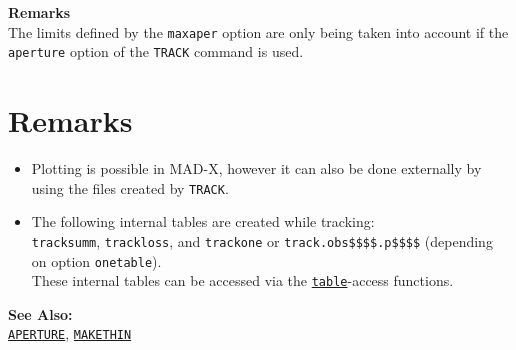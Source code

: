 {\bf Remarks}\\ 
The limits defined by the \texttt{maxaper} option are only being taken
into account if the \texttt{aperture} option of the \texttt{TRACK}
command is used. 
     

\section{Remarks}
\begin{itemize}
   \item Plotting is possible in MAD-X, however it can also be done
     externally by using the files created by \texttt{TRACK}. 

   \item The following internal tables are created while tracking:\\
     \texttt{tracksumm}, 
     \texttt{trackloss}, and 
     \texttt{trackone} or 
     \texttt{track.obs\$\$\$\$.p\$\$\$\$} 
     (depending on option \texttt{onetable}). \\
     These internal tables can be accessed via the
     \href{../Introduction/expression.html#table}{\texttt{table}}-access
     functions.      
\end{itemize}

{\bf See Also:}\\
\href{../Introduction/aperture.html}{\texttt{APERTURE}}, 
\href{../makethin/makethin.html}{\texttt{MAKETHIN}}




